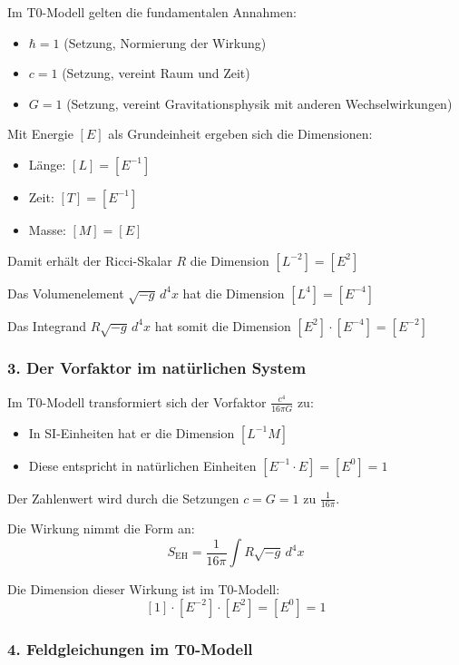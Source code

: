 \documentclass[12pt,a4paper]{article}
\begin{document}
	Im T0-Modell gelten die fundamentalen Annahmen:
	\begin{itemize}
		\item $\hbar = 1$ (Setzung, Normierung der Wirkung)
		\item $c = 1$ (Setzung, vereint Raum und Zeit)
		\item $G = 1$ (Setzung, vereint Gravitationsphysik mit anderen Wechselwirkungen)
	\end{itemize}
	
	Mit Energie $[E]$ als Grundeinheit ergeben sich die Dimensionen:
	\begin{itemize}
		\item Länge: $[L] = [E^{-1}]$
		\item Zeit: $[T] = [E^{-1}]$
		\item Masse: $[M] = [E]$
	\end{itemize}
	
	Damit erhält der Ricci-Skalar $R$ die Dimension $[L^{-2}] = [E^2]$
	
	Das Volumenelement $\sqrt{-g} \, d^4x$ hat die Dimension $[L^4] = [E^{-4}]$
	
	Das Integrand $R\sqrt{-g} \, d^4x$ hat somit die Dimension $[E^2] \cdot [E^{-4}] = [E^{-2}]$
	
	\subsubsection*{3. Der Vorfaktor im natürlichen System}
	
	Im T0-Modell transformiert sich der Vorfaktor $\frac{c^4}{16\pi G}$ zu:
	\begin{itemize}
		\item In SI-Einheiten hat er die Dimension $[L^{-1} M]$
		\item Diese entspricht in natürlichen Einheiten $[E^{-1} \cdot E] = [E^0] = 1$
	\end{itemize}
	
	Der Zahlenwert wird durch die Setzungen $c = G = 1$ zu $\frac{1}{16\pi}$.
	
	Die Wirkung nimmt die Form an:
	\[
	S_{\mathrm{EH}} = \frac{1}{16\pi} \int R \sqrt{-g} \, d^4x
	\]
	
	Die Dimension dieser Wirkung ist im T0-Modell:
	\[
	[1] \cdot [E^{-2}] \cdot [E^2] = [E^0] = 1
	\]
	
	\subsubsection*{4. Feldgleichungen im T0-Modell}
	
\end{document}
